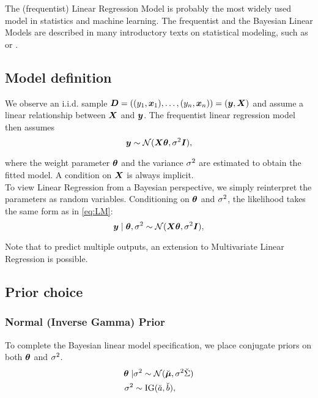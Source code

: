 The (frequentist) Linear Regression Model is probably the most widely used model in statistics and machine learning.
The frequentist and the Bayesian Linear Models are described in many introductory texts on statistical modeling, such as \citet{fahrmeir_regression_2021} or \citet{gelman_bayesian_2013}.


\subsection{Model definition}

We observe an i.i.d. sample $\bm{D} = ((y_1, \bm{x}_1), \dots, (y_n, \bm{x}_n))= (\bm{y}, \bm{X})$ and assume a linear relationship between $\bm{X}$ and $\bm{y}$.
The frequentist linear regression model then assumes
\begin{equation} \label{eq:LM}
    \bm{y} \sim \mathcal{N}(\bm{X} \bm{\theta}, \sigma^2 \bm{I}),
\end{equation}

where the weight parameter $\bm{\theta}$ and the variance $\sigma^2$ are estimated to obtain the fitted model.
A condition on $\bm{X}$ is always implicit.\\

To view Linear Regression from a Bayesian perspective, we simply reinterpret the parameters as random variables.
Conditioning on $\bm{\theta}$ and $\sigma^2$, the likelihood takes the same form as in \autoref{eq:LM}:
\begin{equation} \label{eq:BLM}
    \bm{y} \mid \bm{\theta}, \sigma^2 \sim \mathcal{N}(\bm{X} \bm{\theta}, \sigma^2 \bm{I}), 
\end{equation}

Note that to predict multiple outputs, an extension to Multivariate Linear Regression is possible.

\subsection{Prior choice}
\subsubsection*{Normal (Inverse Gamma) Prior}

To complete the Bayesian linear model specification, we place conjugate priors on both $\bm{\theta}$ and $\sigma^2$.
\begin{equation} \label{eq:NIGprior}
    \begin{aligned}
        \bm{\theta} \mid &\sigma^2 \sim  \mathcal{N}(\breve{\bm{\mu}}, \sigma^2 \breve{\Sigma}) \\
        \sigma^2 &\sim \text{IG}(\breve{a}, \breve{b}),
    \end{aligned}
\end{equation}

